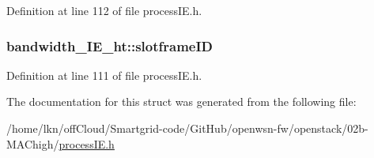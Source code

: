 Definition at line 112 of file process\+I\+E.\+h.

\subsubsection[{\texorpdfstring{slotframe\+ID}{slotframeID}}]{ bandwidth\+\_\+\+I\+E\+\_\+ht\+::slotframe\+ID}\hypertarget{structbandwidth___i_e__ht_a2ebd01b0901f892821116601a32c6dff}{}\label{structbandwidth___i_e__ht_a2ebd01b0901f892821116601a32c6dff}


Definition at line 111 of file process\+I\+E.\+h.



The documentation for this struct was generated from the following file\+:\begin{DoxyCompactItemize}
\item 
/home/lkn/off\+Cloud/\+Smartgrid-\/code/\+Git\+Hub/openwsn-\/fw/openstack/02b-\/\+M\+A\+Chigh/\hyperlink{process_i_e_8h}{process\+I\+E.\+h}\end{DoxyCompactItemize}
